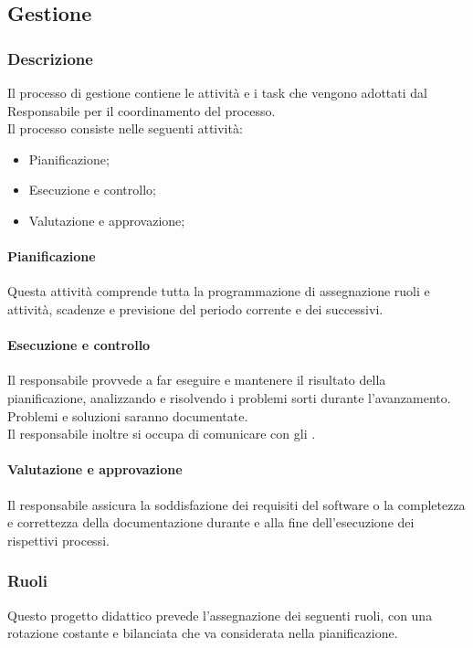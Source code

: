 \subsection{Gestione}

\subsubsection{Descrizione}
Il processo di gestione contiene le attività e i task che vengono adottati dal Responsabile per il coordinamento del processo.\\
Il processo consiste nelle seguenti attività:
\begin{itemize}
  \item Pianificazione;
  \item Esecuzione e controllo;
  \item Valutazione e approvazione;
\end{itemize}

\paragraph{Pianificazione}
Questa attività comprende tutta la programmazione di assegnazione ruoli e attività, scadenze e previsione del periodo corrente e dei successivi.

\paragraph{Esecuzione e controllo}
Il responsabile provvede a far eseguire e mantenere il risultato della pianificazione, analizzando e risolvendo i problemi sorti durante l'avanzamento. Problemi e soluzioni saranno documentate.\\
Il responsabile inoltre si occupa di comunicare con gli .

\paragraph{Valutazione e approvazione}
Il responsabile assicura la soddisfazione dei requisiti del software o la completezza e correttezza della documentazione durante e alla fine dell'esecuzione dei rispettivi processi.

\subsubsection{Ruoli}
Questo progetto didattico prevede l'assegnazione dei seguenti ruoli, con una rotazione costante e bilanciata che va considerata nella pianificazione.

